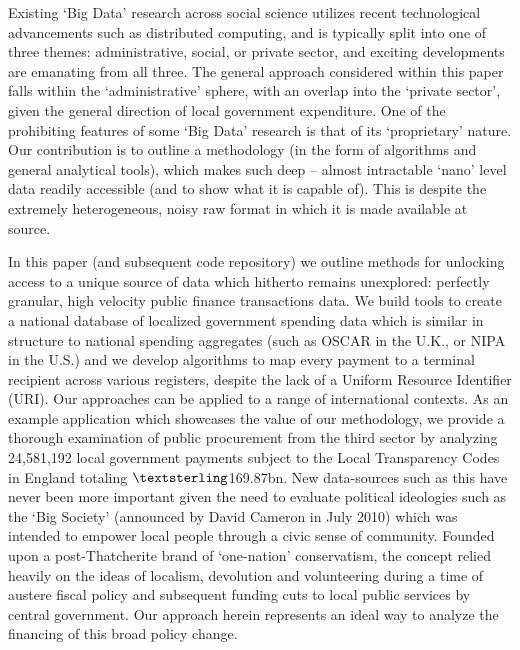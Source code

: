 \documentclass[11pt]{article}
\begin{document}
Existing `Big Data' research across social science utilizes recent technological advancements such as distributed computing, and is typically split into one of three themes: administrative, social, or private sector, and exciting developments are emanating from all three. The general approach considered within this paper falls within the `administrative' sphere, with an overlap into the `private sector', given the general direction of local government expenditure. One of the prohibiting features of some `Big Data' research is that of its `proprietary' nature. Our contribution is to outline a methodology (in the form of algorithms and general analytical tools), which makes such deep -- almost intractable `nano' level data readily accessible (and to show what it is capable of). This is despite the extremely heterogeneous, noisy raw format in which it is made available at source.

In this paper (and subsequent code repository) we outline methods for unlocking access to a unique source of data which hitherto remains unexplored: perfectly granular, high velocity public finance transactions data. We build tools to create a national database of localized government spending data which is similar in structure to national spending aggregates (such as OSCAR in the U.K., or NIPA in the U.S.) and we develop algorithms to map every payment to a terminal recipient across various registers, despite the lack of a Uniform Resource Identifier (URI). Our approaches can be applied to a range of international contexts. As an example application which showcases the value of our methodology, we provide a thorough examination of public procurement from the third sector by analyzing 24,581,192 local government payments subject to the Local Transparency Codes in England totaling $\textsterling$169.87bn. New data-sources such as this have never been more important given the need to evaluate political ideologies such as the `Big Society' (announced by David Cameron in July 2010) which was intended to empower local people through a civic sense of community. Founded upon a post-Thatcherite brand of `one-nation' conservatism, the concept relied heavily on the ideas of localism, devolution and volunteering during a time of austere fiscal policy and subsequent funding cuts to local public services by central government. Our approach herein represents an ideal way to analyze the financing of this broad policy change.
\end{document}
